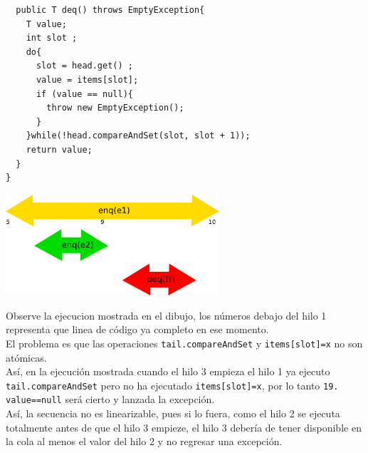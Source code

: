\documentclass{article}
\begin{document}
\begin{enumerate}
\begin{lstlisting}
  public T deq() throws EmptyException{
    T value;
    int slot ;
    do{
      slot = head.get() ;
      value = items[slot];
      if (value == null){
        throw new EmptyException();
      }
    }while(!head.compareAndSet(slot, slot + 1));
    return value;
  }
}
\end{lstlisting}

\begin{center}
  \includegraphics[width=300px]{t10f3.png}
\end{center}
Observe la ejecucion mostrada en el dibujo, los números debajo del hilo 1 representa que linea de código ya completo en ese momento.\\

El problema es que las operaciones {\tt tail.compareAndSet} y {\tt items[slot]=x} no son atómicas.\\
Así, en la ejecución mostrada cuando el hilo 3 empieza el hilo 1 ya ejecuto {\tt tail.compareAndSet} pero no ha ejecutado {\tt items[slot]=x}, por lo tanto {\tt 19.  value==null} será cierto y lanzada la excepción.\\

Así, la secuencia no es linearizable, pues si lo fuera, como el hilo 2 se ejecuta totalmente antes de que el hilo 3 empieze, el hilo 3 debería de tener disponible en la cola al menos el valor del hilo 2 y no regresar una excepción.

\end{enumerate}
\end{document}
